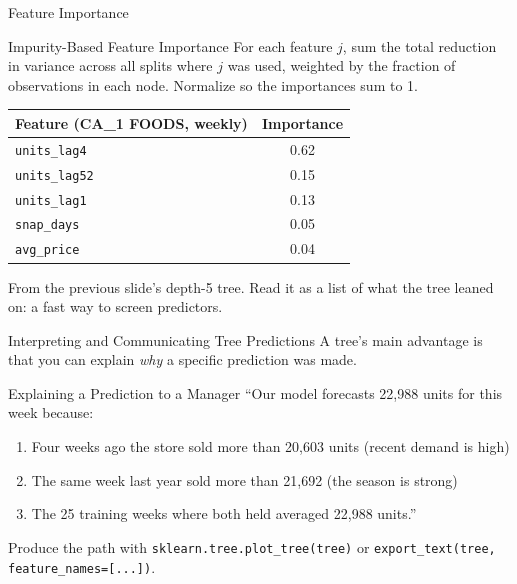 \documentclass[aspectratio=169, 11pt]{beamer}
\begin{document}
\begin{frame}{Feature Importance \parencite{Molnar2022}}
  \begin{definitionbox}{Impurity-Based Feature Importance}
    For each feature $j$, sum the total reduction in variance across all splits
    where $j$ was used, weighted by the fraction of observations in each node.
    Normalize so the importances sum to 1.
  \end{definitionbox}
  \begin{center}
    {\small
    \begin{tabular}{lc}
      \toprule
      \textbf{Feature (CA\_1 FOODS, weekly)} & \textbf{Importance} \\
      \midrule
      \texttt{units\_lag4}  & 0.62 \\
      \texttt{units\_lag52} & 0.15 \\
      \texttt{units\_lag1}  & 0.13 \\
      \texttt{snap\_days}   & 0.05 \\
      \texttt{avg\_price}   & 0.04 \\
      \bottomrule
    \end{tabular}
    }
  \end{center}
  \vspace{-0.1cm}
  From the previous slide's depth-5 tree. Read it as a list of what the tree leaned on: a fast
  way to screen predictors.
\end{frame}

\begin{frame}{Interpreting and Communicating Tree Predictions}
  A tree's main advantage is that you can explain \emph{why} a specific
  prediction was made.
  \begin{examplebox}{Explaining a Prediction to a Manager}
    ``Our model forecasts 22,988 units for this week because:
    \begin{enumerate}\small
      \item Four weeks ago the store sold more than 20,603 units (recent demand is high)
      \item The same week last year sold more than 21,692 (the season is strong)
      \item The 25 training weeks where both held averaged 22,988 units.''
    \end{enumerate}
  \end{examplebox}
  Produce the path with \texttt{sklearn.tree.plot\_tree(tree)} or
  \texttt{export\_text(tree, feature\_names=[...])}.
\end{frame}
\end{document}
